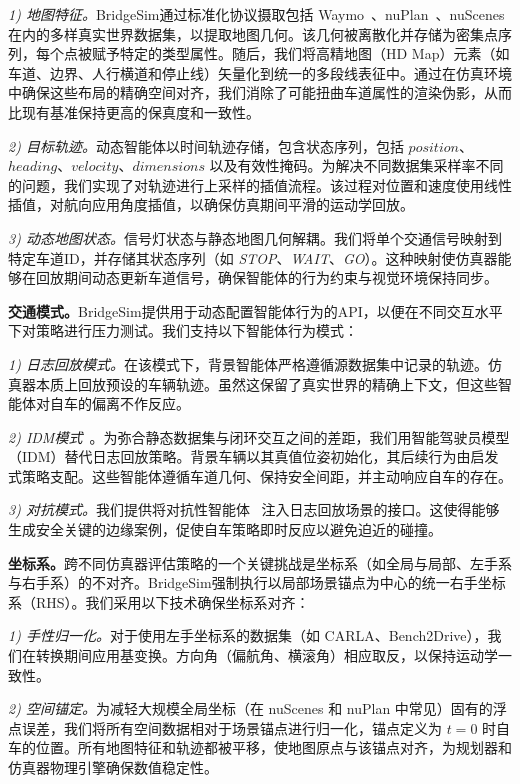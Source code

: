 \documentclass{article}
\begin{document}
\textit{1) 地图特征。}BridgeSim通过标准化协议摄取包括 Waymo~\cite{mei2022waymo}、nuPlan~\cite{caesar2021nuplan}、nuScenes~\cite{caesar2020nuscenes} 在内的多样真实世界数据集，以提取地图几何。该几何被离散化并存储为密集点序列，每个点被赋予特定的类型属性。随后，我们将高精地图（HD Map）元素（如车道、边界、人行横道和停止线）矢量化到统一的多段线表征中。通过在仿真环境中确保这些布局的精确空间对齐，我们消除了可能扭曲车道属性的渲染伪影，从而比现有基准保持更高的保真度和一致性。

\textit{2) 目标轨迹。}动态智能体以时间轨迹存储，包含状态序列，包括 $position$、$heading$、$velocity$、$dimensions$ 以及有效性掩码。为解决不同数据集采样率不同的问题，我们实现了对轨迹进行上采样的插值流程。该过程对位置和速度使用线性插值，对航向应用角度插值，以确保仿真期间平滑的运动学回放。

\textit{3) 动态地图状态。}信号灯状态与静态地图几何解耦。我们将单个交通信号映射到特定车道ID，并存储其状态序列（如 \textit{STOP}、\textit{WAIT}、\textit{GO}）。这种映射使仿真器能够在回放期间动态更新车道信号，确保智能体的行为约束与视觉环境保持同步。

\textbf{交通模式。}BridgeSim提供用于动态配置智能体行为的API，以便在不同交互水平下对策略进行压力测试。我们支持以下智能体行为模式：

\textit{1) 日志回放模式。}在该模式下，背景智能体严格遵循源数据集中记录的轨迹。仿真器本质上回放预设的车辆轨迹。虽然这保留了真实世界的精确上下文，但这些智能体对自车的偏离不作反应。

\textit{2) IDM模式}~\cite{idm}。为弥合静态数据集与闭环交互之间的差距，我们用智能驾驶员模型（IDM）替代日志回放策略。背景车辆以其真值位姿初始化，其后续行为由启发式策略支配。这些智能体遵循车道几何、保持安全间距，并主动响应自车的存在。

\textit{3) 对抗模式。}我们提供将对抗性智能体~\cite{advbmt} 注入日志回放场景的接口。这使得能够生成安全关键的边缘案例，促使自车策略即时反应以避免迫近的碰撞。

\textbf{坐标系。}跨不同仿真器评估策略的一个关键挑战是坐标系（如全局与局部、左手系与右手系）的不对齐。BridgeSim强制执行以局部场景锚点为中心的统一右手坐标系（RHS）。我们采用以下技术确保坐标系对齐：

\textit{1) 手性归一化。}对于使用左手坐标系的数据集（如 CARLA、Bench2Drive），我们在转换期间应用基变换。方向角（偏航角、横滚角）相应取反，以保持运动学一致性。

\textit{2) 空间锚定。}为减轻大规模全局坐标（在 nuScenes 和 nuPlan 中常见）固有的浮点误差，我们将所有空间数据相对于场景锚点进行归一化，锚点定义为 $t=0$ 时自车的位置。所有地图特征和轨迹都被平移，使地图原点与该锚点对齐，为规划器和仿真器物理引擎确保数值稳定性。
\end{document}
